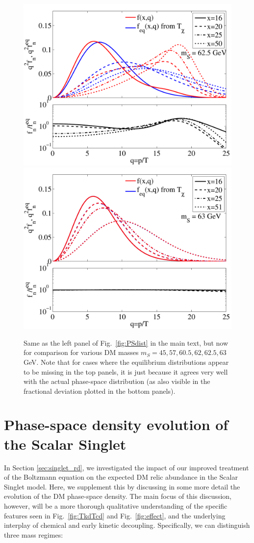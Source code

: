 \documentclass[twocolumn,showpacs,amsmath,amssymb,superscriptaddress,nofootinbib]{revtex4-1}
\begin{document}
\begin{figure}[t!]
  \includegraphics[width=0.66\columnwidth]{phasespace_distr_mDM62_5_kCM}
  \includegraphics[width=0.66\columnwidth]{phasespace_distr_mDM63_kCM}
  \caption{Same as the left panel of Fig.~\ref{fig:PSdist} in the main text, but now for comparison for various DM
  masses $m_S=45,57,60.5, 62,62.5,63$\,GeV. Note that for cases where the equilibrium 
  distributions appear to be missing in the top panels, it is just because it agrees very well 
  with the actual phase-space distribution (as also visible in the fractional deviation plotted in
  the bottom panels).  
 }
    \label{fig:PSdist_multi} \vspace{-0.4cm}
\end{figure}
\newpage
\section{Phase-space density evolution of the Scalar Singlet}
\label{app:SingletDetails}

In Section \ref{sec:singlet_rd}, we investigated the impact of our improved treatment of the 
Boltzmann equation on the expected DM relic abundance in the Scalar Singlet model.
Here, we supplement this by discussing in some more detail the evolution of the DM
phase-space density. The main focus of this discussion, however, will be a more thorough qualitative 
understanding of the specific features seen in Fig.~\ref{fig:TkdTcd} and Fig.~\ref{fig:effect},
and the underlying interplay of chemical and early kinetic decoupling.
Specifically, we can distinguish three mass regimes:
\end{document}
